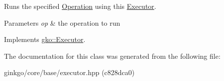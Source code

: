 Runs the specified \hyperlink{classgko_1_1Operation}{Operation} using this \hyperlink{classgko_1_1Executor}{Executor}. 


\begin{DoxyParams}{Parameters}
{\em op} & the operation to run \\
\hline
\end{DoxyParams}


Implements \hyperlink{classgko_1_1Executor_a1de8e2668b76e66690acf5eef9e8324d}{gko\+::\+Executor}.



The documentation for this class was generated from the following file\+:\begin{DoxyCompactItemize}
\item 
ginkgo/core/base/executor.\+hpp (c828dca0)\end{DoxyCompactItemize}
